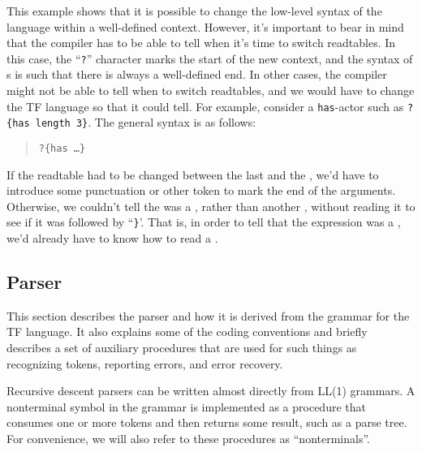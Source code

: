 This example shows that it is possible to change the low-level syntax
of the language within a well-defined context.  However, it's important
to bear in mind that the compiler has to be able to tell when it's time
to switch readtables.  In this case, the ``{\tt ?}'' character marks
the start of the new context, and the syntax of s 
is such that there is always a well-defined end.  In other cases,
the compiler might not be able to tell when to switch readtables,
and we would have to change the TF language so that it could tell.
For example, consider a {\tt has}-actor such as \verb|?{has length 3}|.
The general syntax is as follows:

\begin{quote}
\begin{tabbing}
{\tt ?\{has   \ldots {}\}}
\end{tabbing}
\end{quote}

If the readtable had to be changed between the last 
and the , we'd have to introduce some punctuation or
other token to mark the end of the arguments.  Otherwise, we couldn't
tell the  was a , rather than another
, without reading it to see if it was followed by
``{\tt \}}'.  That is, in order to tell that the expression was a
, we'd already have to know how to read a .




\subsection{Parser}

This section describes the parser and how it is derived from the
grammar for the TF language.  It also explains some of the coding
conventions and briefly describes a set of auxiliary procedures that
are used for such things as recognizing tokens, reporting errors, and
error recovery.

Recursive descent parsers can be written almost directly from
LL(1) grammars.
A nonterminal symbol in the grammar is implemented as a procedure that
consumes one or more tokens and then returns some result, such as a
parse tree.  For convenience, we will also refer to these procedures as
``nonterminals''.

